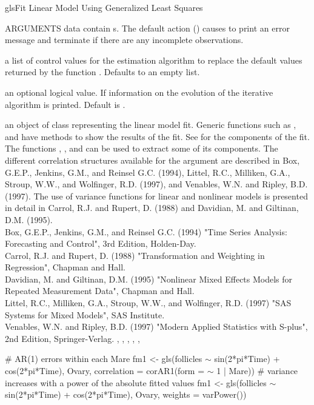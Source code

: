\documentclass[pdftex]{article} \usepackage{url,graphicx}
\renewcommand{\Twiddle}{\mbox{\(\sim\)}}
\begin{document}
\begin{Helpfile}{gls}{Fit Linear Model Using Generalized Least Squares}
\begin{Argument}{ARGUMENTS}
data contain s.  The default action () causes
 to print an error message and terminate if there are any
incomplete observations.
\item[\Co{control:}]
a list of control values for the estimation algorithm to
replace the default values returned by the function .
Defaults to an empty list.
\item[\Co{verbose:}]
an optional logical value. If  information on
the evolution of the iterative algorithm is printed. Default is
.
\end{Argument}
an object of class  representing the linear model
fit. Generic functions such as ,  and 
 have methods to show the results of the fit. See
 for the components of the fit. The functions
, , and  can be used to extract
some of its components.
The different correlation structures available for the
 argument are described in Box, G.E.P., Jenkins,
G.M., and Reinsel G.C. (1994), Littel, R.C., Milliken, G.A., Stroup,
W.W., and Wolfinger, R.D. (1997), and Venables, W.N. and Ripley,
B.D. (1997). The use of variance functions for linear 
and nonlinear models is presented in detail in Carrol, R.J. and Rupert,
D. (1988) and Davidian, M. and Giltinan, D.M. (1995). \\
Box, G.E.P., Jenkins, G.M., and Reinsel G.C. (1994) "Time Series
Analysis: Forecasting and Control", 3rd Edition, Holden-Day. \\
Carrol, R.J. and Rupert, D. (1988) "Transformation and Weighting in
Regression", Chapman and Hall.\\
Davidian, M. and Giltinan, D.M. (1995) "Nonlinear Mixed Effects Models
for Repeated Measurement Data", Chapman and Hall.\\
Littel, R.C., Milliken, G.A., Stroup, W.W., and Wolfinger, R.D. (1997)
"SAS Systems for Mixed Models", SAS Institute.\\
Venables, W.N. and Ripley, B.D. (1997) "Modern Applied Statistics with
S-plus", 2nd Edition, Springer-Verlag.
, ,
, ,
, 
\need 15pt
\vspace{-16pt}
\begin{Example}
# AR(1) errors within each Mare
fm1 <- gls(follicles {\Twiddle} sin(2*pi*Time) + cos(2*pi*Time), Ovary,
           correlation = corAR1(form = {\Twiddle} 1 | Mare))
# variance increases with a power of the absolute fitted values
fm1 <- gls(follicles {\Twiddle} sin(2*pi*Time) + cos(2*pi*Time), Ovary,
           weights = varPower())
\end{Example}
\end{Helpfile}
\end{document}
